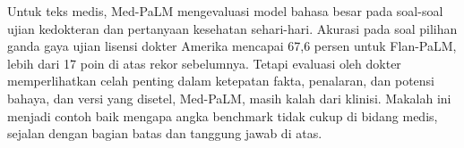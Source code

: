 Untuk teks medis, Med-PaLM \citep{singhal2023} mengevaluasi model bahasa besar pada soal-soal ujian kedokteran dan pertanyaan
kesehatan sehari-hari. Akurasi pada soal pilihan ganda gaya ujian lisensi dokter Amerika mencapai 67,6 persen untuk
Flan-PaLM, lebih dari 17 poin di atas rekor sebelumnya. Tetapi evaluasi oleh dokter memperlihatkan celah penting dalam
ketepatan fakta, penalaran, dan potensi bahaya, dan versi yang disetel, Med-PaLM, masih kalah dari klinisi. Makalah ini
menjadi contoh baik mengapa angka benchmark tidak cukup di bidang medis, sejalan dengan bagian batas dan tanggung jawab
di atas.

